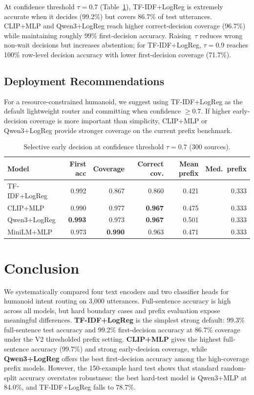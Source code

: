 \documentclass{article}
\begin{document}
At confidence threshold $\tau = 0.7$ (Table~\ref{tab:early}), TF-IDF+LogReg
is extremely accurate when it decides (99.2\%) but covers 86.7\% of test
utterances. CLIP+MLP and Qwen3+LogReg reach higher correct-decision coverage
(96.7\%) while maintaining roughly 99\% first-decision accuracy.
Raising~$\tau$ reduces wrong non-wait decisions but increases abstention; for
TF-IDF+LogReg, $\tau=0.9$ reaches 100\% row-level decision accuracy with lower
first-decision coverage (71.7\%).

\subsection{Deployment Recommendations}
For a resource-constrained humanoid, we suggest using TF-IDF+LogReg as the
default lightweight router and committing when confidence $\ge 0.7$.
If higher early-decision coverage is more important than simplicity, CLIP+MLP
or Qwen3+LogReg provide stronger coverage on the current prefix benchmark.

\begin{table}[h]
  \centering
  \caption{Selective early decision at confidence threshold $\tau = 0.7$ (300 sources).}
  \label{tab:early}
  \small
  \begin{tabular}{lrrrrr}
    \toprule
    Model & First acc & Coverage & Correct cov. & Mean prefix & Med.\ prefix \\
    \midrule
    TF-IDF+LogReg    & 0.992 & 0.867 & 0.860 & 0.421 & 0.333 \\
    CLIP+MLP         & 0.990 & 0.977 & \textbf{0.967} & 0.475 & 0.333 \\
    Qwen3+LogReg     & \textbf{0.993} & 0.973 & \textbf{0.967} & 0.501 & 0.333 \\
    MiniLM+MLP       & 0.973 & \textbf{0.990} & 0.963 & 0.471 & 0.333 \\
    \bottomrule
  \end{tabular}
\end{table}

\section{Conclusion}

We systematically compared four text encoders and two classifier heads for
humanoid intent routing on 3{,}000 utterances.
Full-sentence accuracy is high across all models, but hard boundary cases and
prefix evaluation expose meaningful differences.
\textbf{TF-IDF+LogReg} is the simplest strong default: 99.3\% full-sentence
test accuracy and 99.2\% first-decision accuracy at 86.7\% coverage under the
V2 thresholded prefix setting.
\textbf{CLIP+MLP} gives the highest full-sentence accuracy (99.7\%) and strong
early-decision coverage, while \textbf{Qwen3+LogReg} offers the best
first-decision accuracy among the high-coverage prefix models.
However, the 150-example hard test shows that standard random-split accuracy
overstates robustness: the best hard-test model is Qwen3+MLP at 84.0\%, and
TF-IDF+LogReg falls to 78.7\%.
\end{document}
